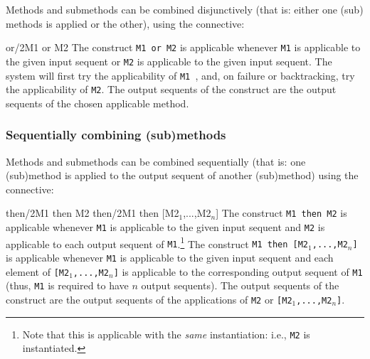 Methods and submethods can be combined disjunctively (that is: either
one (sub) methods is applied or the other), using the 
connective:

\begin{predicate}{or/2}{M1 or M2}%
The construct {\tt M1 or M2} is applicable whenever {\tt M1} is
applicable to the given input sequent or {\tt M2} is applicable to the
given input sequent. The system will first try the applicability of
{\tt M1 }, and, on failure or backtracking, try the applicability of
{\tt M2}. The output sequents of the  construct are
the output sequents of the chosen applicable method.
\end{predicate}

\subsubsection {Sequentially combining (sub)methods}

Methods and submethods can be combined sequentially (that is: one
(sub)method is applied to the output sequent of another (sub)method)
using the  connective:

\begin{twopredicates}{then/2}{M1 then M2}%
      {then/2}{M1 then [M2$_1$,...,M2$_n$]}%
The construct {\tt M1 then M2} is applicable whenever {\tt M1} is
applicable to the given input sequent and {\tt M2} is applicable to
each output sequent of {\tt M1}.\footnote {Note that this is
applicable with the {\em same\/} instantiation: i.e., {\tt M2} is instantiated.}   The construct
{\tt M1 then [M2$_1$,...,M2$_n$]} is applicable whenever {\tt M1} is
applicable to the given input sequent and each element of
{\tt [M2$_1$,...,M2$_n$]} is applicable to the corresponding output
sequent of {\tt M1} (thus, {\tt M1} is required to have $n$ output
sequents). The output sequents of the  construct are the
output sequents of the applications of {\tt M2} or
{\tt [M2$_1$,...,M2$_n$]}.
\end{twopredicates}


